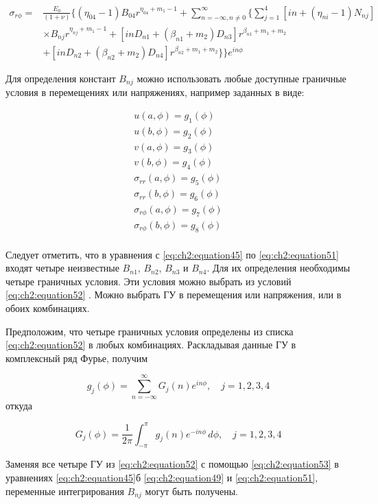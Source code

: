 \begin{equation}
	\label{eq:ch2:equation51}
	\begin{split}
	\sigma_{r\phi} =& \frac{E_0}{\left (1+\nu \right ) }
	\Big \{ \left ( \eta_{04}-1 \right) B_{04} r^{\eta_{04}+m_1-1} +\sum_{n=-\infty, n\ne 0}^{\infty} \big\{  \sum_{j=1}^4 \left [ in+ \left (\eta_{ni} -  1  \right ) N_{nj} \right ]\\
	&\times B_{nj} r^{\eta_{nj}+m_1-1} + \left [  in D_{n1} + \left ( \beta_{n1} + m_2 \right ) D_{n3} \right ] r^{\beta_{n1}+m_1+m_2} \\
	&+\left [ in D_{n2} + \left ( \beta_{n2} + m_2 \right ) D_{n4} \right ] r^{\beta_{n2}+m_1+m_2} \big\} \Big \} e^{in\phi}		
	\end{split}
\end{equation}


Для определения констант \(B_{nj}\) можно использовать любые доступные граничные условия в перемещениях или напряжениях, например заданных в виде:

\begin{equation}
\label{eq:ch2:equation52}
\begin{split}
	u(a, \phi) = g_1 (\phi) \\
	u(b, \phi) = g_2 (\phi) \\
	v(a, \phi) = g_3 (\phi) \\
	v(b, \phi) = g_4 (\phi) \\
	\sigma_{rr}(a, \phi) = g_5 (\phi) \\
	\sigma_{rr}(b, \phi) = g_6 (\phi) \\
	\sigma_{r\phi}(a, \phi) = g_7 (\phi) \\
	\sigma_{r\phi}(b, \phi) = g_8 (\phi) \\
\end{split}
\end{equation}

Следует отметить, что в уравнения с \cref{eq:ch2:equation45} по \cref{eq:ch2:equation51} входят четыре неизвестные \(B_{n1}\), \(B_{n2}\), \(B_{n3}\) и \(B_{n4}\). Для их определения необходимы четыре граничных условия. Эти условия можно выбрать из условий \cref{eq:ch2:equation52} . Можно выбрать ГУ в перемещения или напряжения, или в обоих комбинациях.

Предположим, что четыре граничных условия определены из списка \cref{eq:ch2:equation52} в любых комбинациях. Раскладывая данные ГУ в комплексный ряд Фурье, получим

\begin{equation}
\label{eq:ch2:equation53}
	g_j(\phi) = \sum_{n=-\infty}^{\infty} G_j(n) e^{in\phi}, \quad j=1,2,3,4
\end{equation}
откуда

\begin{equation}
	\label{eq:ch2:equation54}
	G_j(\phi) = \frac{1}{2\pi}\int_{-\pi}^{\pi} g_j(n) e^{-in\phi}\,d\phi, \quad j=1,2,3,4
\end{equation}

Заменяя все четыре ГУ из \cref{eq:ch2:equation52} с помощью \cref{eq:ch2:equation53} в уравнениях \cref{eq:ch2:equation45}б \cref{eq:ch2:equation49} и \cref{eq:ch2:equation51}, переменные интегрирования \(B_{nj} \) могут быть получены.